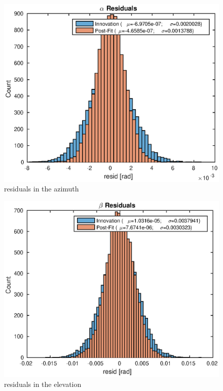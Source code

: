 \documentclass{article}
\begin{document}
\begin{figure}[!htbp]
	\centering
	\includegraphics[scale=0.7]{figs/resid_alpha.eps}
	\caption{residuals in the azimuth}
	\label{fig:resid_alpha}
\end{figure}

\begin{figure}[!htbp]
	\centering
	\includegraphics[scale=0.7]{figs/resid_beta.eps}
	\caption{residuals in the elevation}
	\label{fig:resid_beta}
\end{figure}
\end{document}
